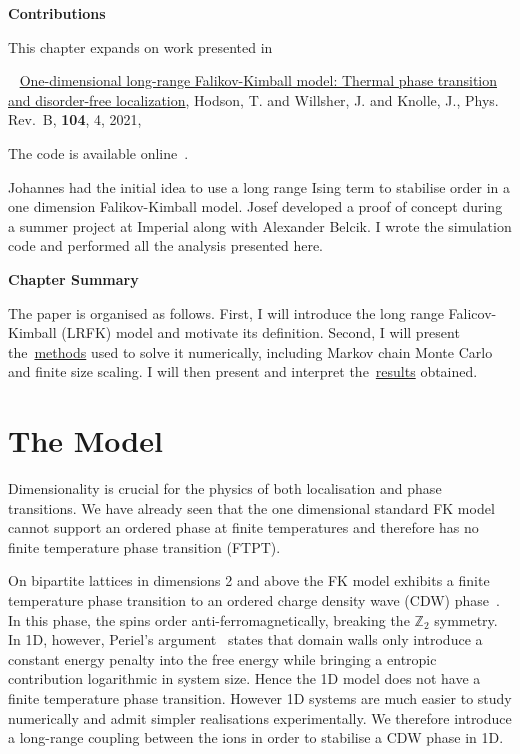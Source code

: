 \textbf{Contributions}

This chapter expands on work presented in

~\autocite{hodsonOnedimensionalLongrangeFalikovKimball2021} \href{https://link.aps.org/doi/10.1103/PhysRevB.104.045116}{One-dimensional long-range Falikov-Kimball model: Thermal phase transition and disorder-free localization}, Hodson, T. and Willsher, J. and Knolle, J., Phys. Rev.~B, \textbf{104}, 4, 2021,

The code is available online~\autocite{hodsonMCMCFKModel2021}.

Johannes had the initial idea to use a long range Ising term to stabilise order in a one dimension Falikov-Kimball model. Josef developed a proof of concept during a summer project at Imperial along with Alexander Belcik. I wrote the simulation code and performed all the analysis presented here.

\textbf{Chapter Summary}

The paper is organised as follows. First, I will introduce the long range Falicov-Kimball (LRFK) model and motivate its definition. Second, I will present the~\protect\hyperlink{sec:lrfk-methods}{methods} used to solve it numerically, including Markov chain Monte Carlo and finite size scaling. I will then present and interpret the~\protect\hyperlink{sec:lrfk-results}{results} obtained.

\hypertarget{sec:lrfk-model}{%
\section{The Model}\label{sec:lrfk-model}}

Dimensionality is crucial for the physics of both localisation and phase transitions. We have already seen that the one dimensional standard FK model cannot support an ordered phase at finite temperatures and therefore has no finite temperature phase transition (FTPT).

On bipartite lattices in dimensions 2 and above the FK model exhibits a finite temperature phase transition to an ordered charge density wave (CDW) phase~\autocite{maskaThermodynamicsTwodimensionalFalicovKimball2006}. In this phase, the spins order anti-ferromagnetically, breaking the \(\mathbb{Z}_2\) symmetry. In 1D, however, Periel's argument~\autocite{peierlsIsingModelFerromagnetism1936,kennedyItinerantElectronModel1986} states that domain walls only introduce a constant energy penalty into the free energy while bringing a entropic contribution logarithmic in system size. Hence the 1D model does not have a finite temperature phase transition. However 1D systems are much easier to study numerically and admit simpler realisations experimentally. We therefore introduce a long-range coupling between the ions in order to stabilise a CDW phase in 1D.

